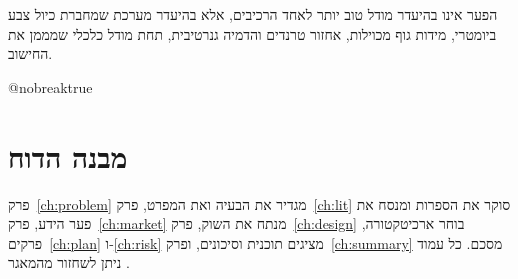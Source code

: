 \begin{keymessagebox}
הפער אינו בהיעדר מודל טוב יותר לאחד הרכיבים, אלא בהיעדר מערכת שמחברת כיול צבע ביומטרי, מידות גוף מכוילות, אחזור טרנדים והדמיה גנרטיבית, תחת מודל כלכלי שמממן את החישוב.
\end{keymessagebox}

\csname @nobreaktrue\endcsname %
\section{מבנה הדוח}
\label{sec:structure}

פרק~\ref{ch:problem} מגדיר את הבעיה ואת המפרט, פרק~\ref{ch:lit} סוקר את הספרות ומנסח את פער הידע, פרק~\ref{ch:market} מנתח את השוק, פרק~\ref{ch:design} בוחר ארכיטקטורה, פרקים~\ref{ch:plan} ו-\ref{ch:risk} מציגים תוכנית וסיכונים, ופרק~\ref{ch:summary} מסכם. כל עמוד ניתן לשחזור מהמאגר \cite{segal2026l03}.
